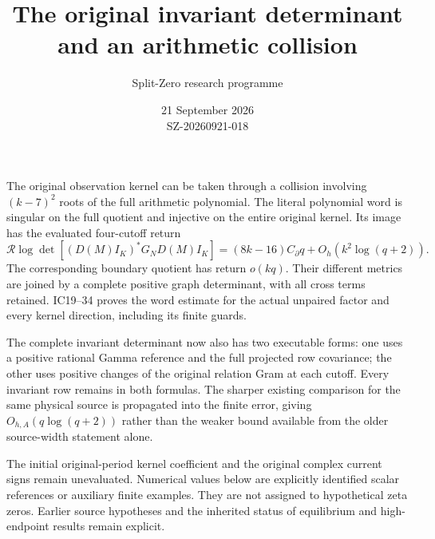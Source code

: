 \documentclass[11pt]{article}
\title{The original invariant determinant\\and an arithmetic collision}
\author{Split-Zero research programme}
\date{21 September 2026\\SZ-20260921-018}
\begin{document}
\maketitle
The original observation kernel can be taken through a collision involving
$(k-7)^2$ roots of the full arithmetic polynomial. The literal polynomial
word is singular on the full quotient and injective on the entire original
kernel. Its image has the evaluated four-cutoff return
\[
\mathcal R\log\det[(D(M)I_K)^*G_ND(M)I_K]
=(8k-16)C_\partial q+O_h(k^2\log(q+2)).
\]
The corresponding boundary quotient has return $o(kq)$. Their different
metrics are joined by a complete positive graph determinant, with all
cross terms retained. IC19--34 proves the word estimate for the actual
unpaired factor and every kernel direction, including its finite guards.

The complete invariant determinant now also has two executable forms:
one uses a positive rational Gamma reference and the full projected row
covariance; the other uses positive changes of the original relation
Gram at each cutoff. Every invariant row remains in both formulas. The
sharper existing comparison for the same physical source is propagated
into the finite error, giving $O_{h,A}(q\log(q+2))$ rather than the weaker
bound available from the older source-width statement alone.

The initial original-period kernel coefficient and the original complex
current signs remain unevaluated. Numerical values below are explicitly
identified scalar references or auxiliary finite examples. They are not
assigned to hypothetical zeta zeros. Earlier source hypotheses and the
inherited status of equilibrium and high-endpoint results remain explicit.
\begingroup\small\tableofcontents\endgroup\clearpage
\end{document}
